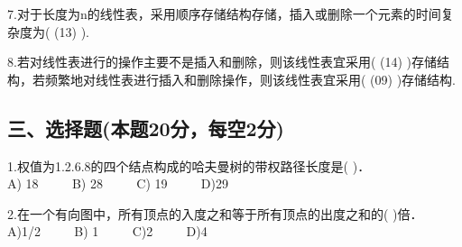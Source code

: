 7.对于长度为n的线性表，采用顺序存储结构存储，插入或删除一个元素的时间复杂度为( (13) ).

8.若对线性表进行的操作主要不是插入和删除，则该线性表宜采用( (14) )存储结构，若频繁地对线性表进行插入和删除操作，则该线性表宜采用( (09) )存储结构.

\subsection{三、选择题(本题20分，每空2分)}
1.权值为{1.2.6.8}的四个结点构成的哈夫曼树的带权路径长度是(  )． \\
A) 18 $\qquad$ B) 28 $\qquad$ C) 19 $\qquad$ D)29

2.在一个有向图中，所有顶点的入度之和等于所有顶点的出度之和的( )倍． \\
A)1/2 $\qquad$ B) 1 $\qquad$ C)2 $\qquad$ D)4

